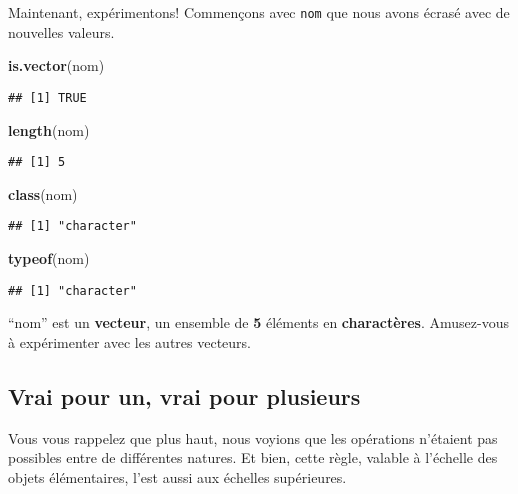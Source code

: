 \documentclass[]{book}
\newenvironment{Shaded}{\begin{snugshade}}{\end{snugshade}}
\newcommand{\KeywordTok}[1]{\textcolor[rgb]{0.13,0.29,0.53}{\textbf{#1}}}
\newcommand{\NormalTok}[1]{#1}
\begin{document}
Maintenant, expérimentons! Commençons avec \texttt{nom} que nous avons
écrasé avec de nouvelles valeurs.

\begin{Shaded}
\begin{Highlighting}[]
\KeywordTok{is.vector}\NormalTok{(nom)}
\end{Highlighting}
\end{Shaded}

\begin{verbatim}
## [1] TRUE
\end{verbatim}

\begin{Shaded}
\begin{Highlighting}[]
\KeywordTok{length}\NormalTok{(nom)}
\end{Highlighting}
\end{Shaded}

\begin{verbatim}
## [1] 5
\end{verbatim}

\begin{Shaded}
\begin{Highlighting}[]
\KeywordTok{class}\NormalTok{(nom)}
\end{Highlighting}
\end{Shaded}

\begin{verbatim}
## [1] "character"
\end{verbatim}

\begin{Shaded}
\begin{Highlighting}[]
\KeywordTok{typeof}\NormalTok{(nom)}
\end{Highlighting}
\end{Shaded}

\begin{verbatim}
## [1] "character"
\end{verbatim}

``nom'' est un \textbf{vecteur}, un ensemble de \textbf{5} éléments en
\textbf{charactères}. Amusez-vous à expérimenter avec les autres
vecteurs.

\subsection{Vrai pour un, vrai pour
plusieurs}\label{vrai-pour-un-vrai-pour-plusieurs}

Vous vous rappelez que plus haut, nous voyions que les opérations
n'étaient pas possibles entre de différentes natures. Et bien, cette
règle, valable à l'échelle des objets élémentaires, l'est aussi aux
échelles supérieures.
\end{document}
